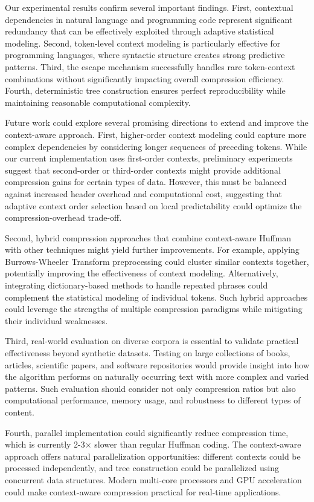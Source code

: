\documentclass[conference]{IEEEtran}
\begin{document}
Our experimental results confirm several important findings. First, contextual dependencies in natural language and programming code represent significant redundancy that can be effectively exploited through adaptive statistical modeling. Second, token-level context modeling is particularly effective for programming languages, where syntactic structure creates strong predictive patterns. Third, the escape mechanism successfully handles rare token-context combinations without significantly impacting overall compression efficiency. Fourth, deterministic tree construction ensures perfect reproducibility while maintaining reasonable computational complexity.

Future work could explore several promising directions to extend and improve the context-aware approach. First, higher-order context modeling could capture more complex dependencies by considering longer sequences of preceding tokens. While our current implementation uses first-order contexts, preliminary experiments suggest that second-order or third-order contexts might provide additional compression gains for certain types of data. However, this must be balanced against increased header overhead and computational cost, suggesting that adaptive context order selection based on local predictability could optimize the compression-overhead trade-off.

Second, hybrid compression approaches that combine context-aware Huffman with other techniques might yield further improvements. For example, applying Burrows-Wheeler Transform preprocessing could cluster similar contexts together, potentially improving the effectiveness of context modeling. Alternatively, integrating dictionary-based methods to handle repeated phrases could complement the statistical modeling of individual tokens. Such hybrid approaches could leverage the strengths of multiple compression paradigms while mitigating their individual weaknesses.

Third, real-world evaluation on diverse corpora is essential to validate practical effectiveness beyond synthetic datasets. Testing on large collections of books, articles, scientific papers, and software repositories would provide insight into how the algorithm performs on naturally occurring text with more complex and varied patterns. Such evaluation should consider not only compression ratios but also computational performance, memory usage, and robustness to different types of content.

Fourth, parallel implementation could significantly reduce compression time, which is currently 2-3× slower than regular Huffman coding. The context-aware approach offers natural parallelization opportunities: different contexts could be processed independently, and tree construction could be parallelized using concurrent data structures. Modern multi-core processors and GPU acceleration could make context-aware compression practical for real-time applications.
\end{document}
